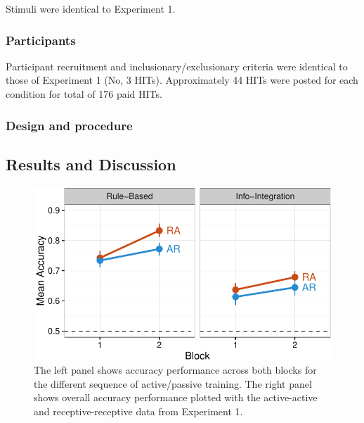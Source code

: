 \documentclass[10pt, letterpaper]{article}
\newenvironment{CodeChunk}{}{}
\begin{document}
Stimuli were identical to Experiment 1.

\subsubsection{Participants}\label{participants-2}

Participant recruitment and inclusionary/exclusionary criteria were
identical to those of Experiment 1 (No, 3 HITs). Approximately 44 HITs
were posted for each condition for total of 176 paid HITs.

\subsubsection{Design and procedure}\label{design-and-procedure-2}

\subsection{Results and Discussion}\label{results-and-discussion-2}

\begin{CodeChunk}
\captionsetup{width=0.8\textwidth}\begin{figure}[h]

{\centering \includegraphics{figs/exp2_acc_plot-1} 

}

\caption[The left panel shows accuracy performance across both blocks for the different sequence of active/passive training]{The left panel shows accuracy performance across both blocks for the different sequence of active/passive training. The right panel shows overall accuracy performance plotted with the active-active and receptive-receptive data from Experiment 1.}\label{fig:exp2_acc_plot}
\end{figure}
\end{CodeChunk}
\end{document}
